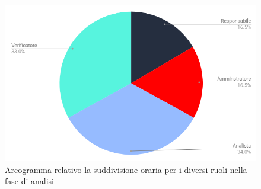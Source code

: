 \begin{figure}[h!]
	\centering
	\caption{Areogramma relativo la suddivisione oraria per i diversi ruoli nella fase di analisi}
    \includegraphics[scale=0.60]{./src/Preventivo/src/img/TortaAnalisi.png}    
\end{figure}

